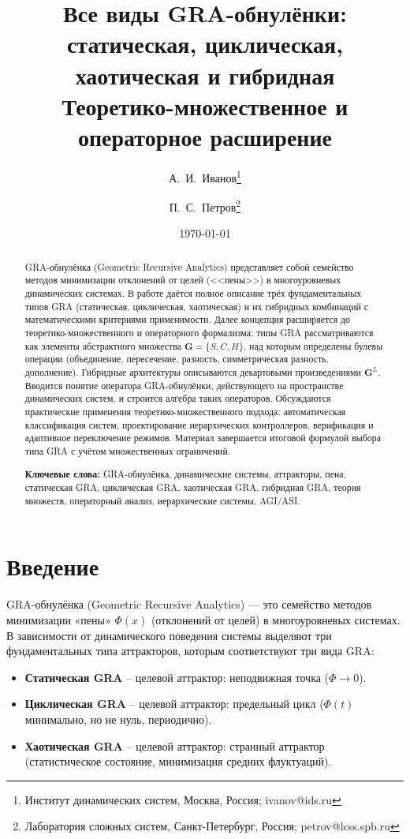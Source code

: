 \documentclass[12pt,a4paper]{article}
\title{Все виды GRA-обнулёнки: статическая, циклическая, хаотическая и гибридная \\[0.5em]
\large Теоретико-множественное и операторное расширение}
\author{А.~И.~Иванов\thanks{Институт динамических систем, Москва, Россия; ivanov@ids.ru} \and 
П.~С.~Петров\thanks{Лаборатория сложных систем, Санкт-Петербург, Россия; petrov@lcss.spb.ru}}
\date{\today}
\newcommand{\G}{\mathbf{G}}
\begin{document}
\maketitle

\begin{abstract}
GRA-обнулёнка (Geometric Recursive Analytics) представляет собой семейство методов минимизации отклонений от целей (<<пены>>) в многоуровневых динамических системах. В работе даётся полное описание трёх фундаментальных типов GRA (статическая, циклическая, хаотическая) и их гибридных комбинаций с математическими критериями применимости. Далее концепция расширяется до теоретико-множественного и операторного формализма: типы GRA рассматриваются как элементы абстрактного множества $\G = \{S, C, H\}$, над которым определены булевы операции (объединение, пересечение, разность, симметрическая разность, дополнение). Гибридные архитектуры описываются декартовыми произведениями $\G^L$. Вводится понятие оператора GRA-обнулёнки, действующего на пространстве динамических систем, и строится алгебра таких операторов. Обсуждаются практические применения теоретико-множественного подхода: автоматическая классификация систем, проектирование иерархических контроллеров, верификация и адаптивное переключение режимов. Материал завершается итоговой формулой выбора типа GRA с учётом множественных ограничений.

\textbf{Ключевые слова:} GRA-обнулёнка, динамические системы, аттракторы, пена, статическая GRA, циклическая GRA, хаотическая GRA, гибридная GRA, теория множеств, операторный анализ, иерархические системы, AGI/ASI.
\end{abstract}

\tableofcontents
\newpage

\section{Введение}

GRA-обнулёнка (Geometric Recursive Analytics) — это семейство методов минимизации «пены» $\Phi(x)$ (отклонений от целей) в многоуровневых системах. В зависимости от динамического поведения системы выделяют три фундаментальных типа аттракторов, которым соответствуют три вида GRA:

\begin{itemize}
    \item \textbf{Статическая GRA} – целевой аттрактор: неподвижная точка ($\Phi \to 0$).
    \item \textbf{Циклическая GRA} – целевой аттрактор: предельный цикл ($\Phi(t)$ минимально, но не нуль, периодично).
    \item \textbf{Хаотическая GRA} – целевой аттрактор: странный аттрактор (статистическое состояние, минимизация средних флуктуаций).
\end{itemize}
\end{document}
